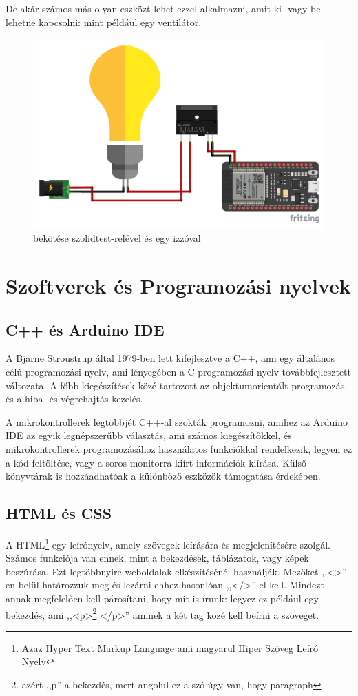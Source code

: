 \documentclass[
]{thesis-ekf}
\theoremstyle{definition}
\theoremstyle{remark}
\begin{document}
	De akár számos más olyan eszközt lehet ezzel alkalmazni, amit ki- vagy be lehetne kapcsolni: mint például egy ventilátor.
	
	\begin{figure}[ht!]
		\centering
		\includegraphics[width=1\textwidth]{./src/schematics/ESP32 toggle schematics_bb}
		\caption{ bekötése szolidtest-relével és egy izzóval}
		\label{toggle-schematics}
	\end{figure}	
	
	\section{Szoftverek és Programozási nyelvek}
	\subsection{C++ és Arduino IDE}
	A Bjarne Stroustrup által 1979-ben lett kifejlesztve a C++, ami egy általános célú programozási nyelv, ami lényegében a C programozási nyelv továbbfejlesztett változata. A főbb kiegészítések közé tartozott az objektumorientált programozás, és a hiba- és végrehajtás kezelés.\cite{cpp}
	
	A mikrokontrollerek legtöbbjét C++-al szokták programozni, amihez az Arduino IDE az egyik legnépszerűbb választás, ami számos kiegészítőkkel, és mikrokontrollerek programozásához használatos funkciókkal rendelkezik, legyen ez a kód feltöltése, vagy a soros monitorra kiírt információk kiírása. Külső könyvtárak is hozzáadhatóak a különböző eszközök támogatása érdekében. 
	
	\subsection{HTML és CSS}
	A HTML\footnote{Azaz Hyper Text Markup Language ami magyarul Hiper Szöveg Leíró Nyelv}  egy leírónyelv, amely szövegek leírására és megjelenítésére szolgál. Számos funkciója van ennek, mint a bekezdések, táblázatok, vagy képek beszúrása. Ezt legtöbbnyire weboldalak elkészítésénél használják. Mezőket ,,<>''-en belül határozzuk meg és lezárni ehhez hasonlóan ,,</>''-el kell. Mindezt annak megfelelően kell párosítani, hogy mit is írunk: legyez ez például egy bekezdés, ami ,,<p>\footnote{azért ,,p'' a bekezdés, mert angolul ez a szó úgy van, hogy paragraph} </p>'' aminek a két tag közé kell beírni a szöveget.
	
\end{document}
